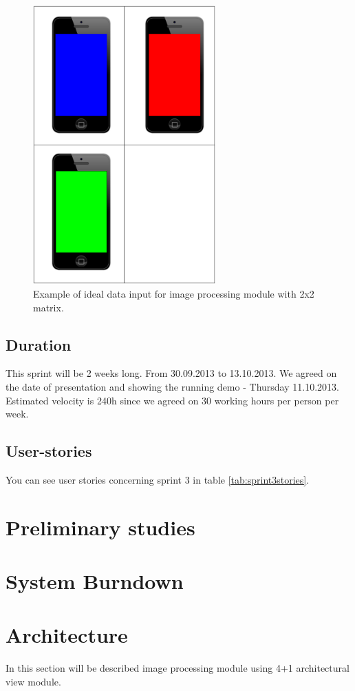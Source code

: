 \begin{figure}[H]
	\centering
		\includegraphics[width=7cm]{sprint3/sprint3_goal.pdf}
	\caption{Example of ideal data input for image processing module with 2x2 matrix.}
	\label{img:sprint3_goal}
\end{figure}

\subsection{Duration}
This sprint will be 2 weeks long. From 30.09.2013 to 13.10.2013.
We agreed on the date of presentation and showing the running demo - Thursday 11.10.2013.
Estimated velocity is 240h since we agreed on 30 working hours per person per week.

\subsection{User-stories}
You can see user stories concerning sprint 3 in table \ref{tab:sprint3stories}.

\section{Preliminary studies}

\section{System Burndown}
\section{Architecture}
In this section will be described image processing module using 4+1 architectural view module.

